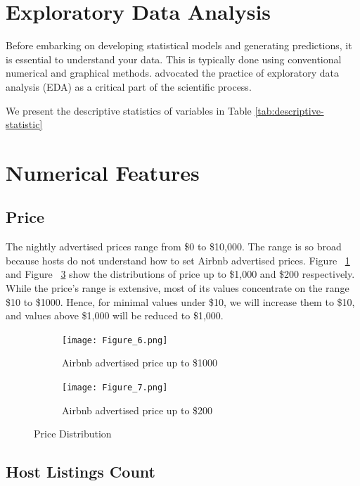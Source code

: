 \section{Exploratory Data Analysis}
Before embarking on developing statistical models and generating predictions, it
is essential to understand your data. This is typically done using conventional
numerical and graphical methods. \textcite{tukey1977exploratory} advocated the practice
of exploratory data analysis (EDA) as a critical part of the scientific process.

We present the descriptive statistics of variables in Table
\ref{tab:descriptive-statistic}

\section{Numerical Features}
\label{sec:numerical_features}
\subsection{Price}
The nightly advertised prices range from \$0 to \$10,000. The range is so broad
because hosts do not understand how to set Airbnb advertised prices.  Figure
~\ref{fig:price-distribution-1000} and Figure ~\ref{fig:price-distribution-200}
 show the distributions of price up to \$1,000 and \$200 respectively. While the
price's range is extensive, most of its values concentrate on the range \$10 to
\$1000.  Hence, for minimal values under \$10, we will increase them to \$10,
and values above \$1,000 will be reduced to \$1,000.
\begin{figure}[H]
    \centering
    \begin{subfigure}[b]{0.48\textwidth}
        \centering
        \texttt{[image: Figure\_6.png]}
        \caption{Airbnb advertised price up to \$1000}
        \label{fig:price-distribution-1000}
    \end{subfigure}
    \begin{subfigure}[b]{0.48\textwidth}
        \centering
        \texttt{[image: Figure\_7.png]}
        \caption{Airbnb advertised price up to \$200}
        \label{fig:price-distribution-200}
    \end{subfigure}
    \caption{Price Distribution}
\end{figure}

\subsection{Host Listings Count}

